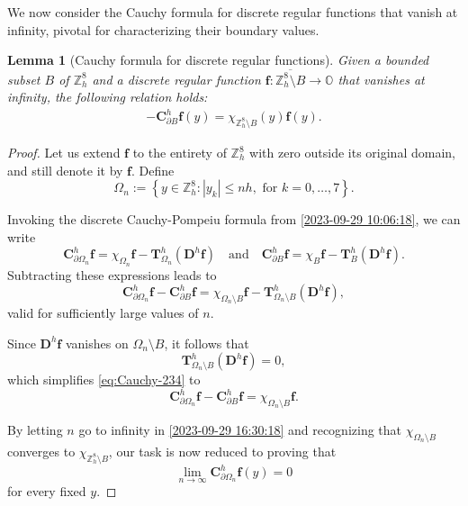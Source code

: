 \documentclass{amsart}
\newtheorem{lemma}[theorem]{Lemma}
\theoremstyle{definition}
\theoremstyle{remark}
\numberwithin{equation}{section}
\newcommand{\p}{\partial}
\newcommand{\OO}{\mathbb O}
\newcommand{\Z}{\mathbb Z}
\newcommand{\f}{\bm{f}}
\begin{document}
We now consider the Cauchy formula for discrete regular functions that vanish at infinity, pivotal for characterizing their boundary values.



\begin{lemma}[Cauchy formula for discrete regular functions]\label{2023-09-29 17:40:15}
	Given a bounded subset \(B\) of \(\Z^8_h\) and a discrete regular function \(\f: \overline{\Z^8_h\setminus B}\rightarrow \OO\) that vanishes at infinity, the following relation holds:
\begin{eqnarray}\label{estimate-094}
	-\bm C^h_{\p B} \f(y) = \chi_{\Z^8_h\setminus B}(y) \f(y).
\end{eqnarray}
\end{lemma}

\begin{proof} 	Let us extend $\f$ to the entirety of $\Z^8_h$ with zero outside its original domain, and still denote it by $\f$. Define
	\[
	\Omega_n := \left\{ y \in \Z^8_h : |y_k| \leqslant nh, \text{ for } k = 0,\dots,7 \right\}.
	\]
	
	Invoking the discrete Cauchy-Pompeiu formula from \eqref{2023-09-29 10:06:18}, we can write
	\[
	\bm C^h_{\p \Omega_n} \f = \chi_{\Omega_n} \f - \bm T^h_{\Omega_n} (\bm D^h \f) \quad \text{and} \quad \bm C^h_{\p B} \f = \chi_{B} \f - \bm T^h_{B} (\bm D^h \f).
	\]
	Subtracting these expressions leads to
	\begin{equation}\label{eq:Cauchy-234}
		\bm C^h_{\p \Omega_n} \f - \bm C^h_{\p B} \f = \chi_{\Omega_n\setminus B} \f - \bm T^h_{\Omega_n\setminus B} (\bm D^h \f),
	\end{equation}
	valid for sufficiently large values of $n$.
	
	Since  $\bm D^h \f$ vanishes on $\Omega_n\setminus B$, it follows that
	\[
	\bm T^h_{\Omega_n\setminus B} (\bm D^h \f) = 0,
	\]
	which simplifies \eqref{eq:Cauchy-234} to
	\begin{equation}
		\label{2023-09-29 16:30:18}
		\bm C^h_{\p \Omega_n} \f - \bm C^h_{\p B} \f = \chi_{\Omega_n\setminus B} \f.
	\end{equation}
	
	
	By letting $n$ go  to infinity   in \eqref{2023-09-29 16:30:18} and recognizing that $\chi_{\Omega_n\setminus B}$ converges to $\chi_{\Z^8_h\setminus B}$, our task is now reduced to proving that
	\[
	\lim_{n \to \infty} \bm C^h_{\p \Omega_n} \f(y) = 0
	\]
	for every fixed $y$.
	
	
 	

\end{proof}
\end{document}
